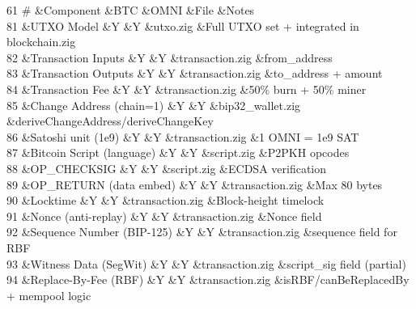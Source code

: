 \begin{DoxyTable}{6}{}{}{1}
\#  &Component  &BTC  &OMNI  &File  &Notes  \\
81  &UTXO Model  &Y  &Y  &utxo.\+zig  &Full UTXO set + integrated in blockchain.\+zig  \\
82  &Transaction Inputs  &Y  &Y  &transaction.\+zig  &from\+\_\+address  \\
83  &Transaction Outputs  &Y  &Y  &transaction.\+zig  &to\+\_\+address + amount  \\
84  &Transaction Fee  &Y  &Y  &transaction.\+zig  &50\% burn + 50\% miner  \\
85  &Change Address (chain=1)  &Y  &Y  &bip32\+\_\+wallet.\+zig  &derive\+Change\+Address/\+derive\+Change\+Key  \\
86  &Satoshi unit (1e9)  &Y  &Y  &transaction.\+zig  &1 OMNI = 1e9 SAT  \\
87  &Bitcoin Script (language)  &Y  &Y  &script.\+zig  &P2\+PKH opcodes  \\
88  &OP\+\_\+\+CHECKSIG  &Y  &Y  &script.\+zig  &ECDSA verification  \\
89  &OP\+\_\+\+RETURN (data embed)  &Y  &Y  &transaction.\+zig  &Max 80 bytes  \\
90  &Locktime  &Y  &Y  &transaction.\+zig  &Block-\/height timelock  \\
91  &Nonce (anti-\/replay)  &Y  &Y  &transaction.\+zig  &Nonce field  \\
92  &Sequence Number (BIP-\/125)  &Y  &Y  &transaction.\+zig  &sequence field for RBF  \\
93  &Witness Data (Seg\+Wit)  &Y  &Y  &transaction.\+zig  &script\+\_\+sig field (partial)  \\
94  &Replace-\/\+By-\/\+Fee (RBF)  &Y  &Y  &transaction.\+zig  &is\+RBF/\+can\+Be\+Replaced\+By + mempool logic  \\

\end{DoxyTable}
